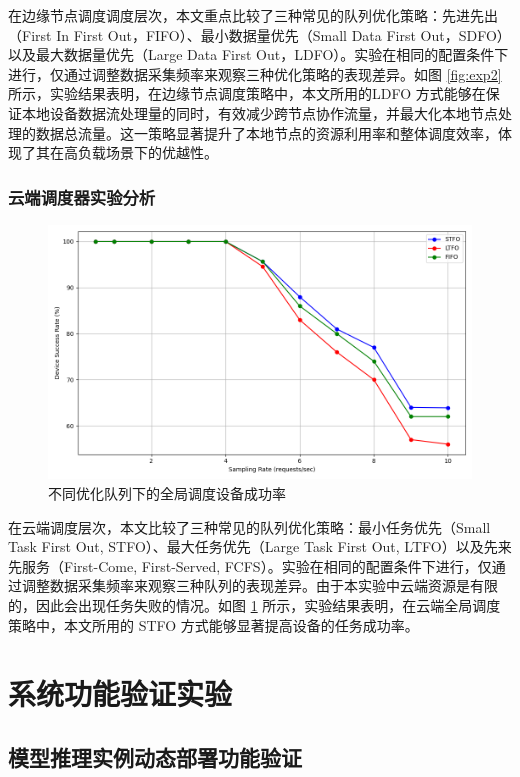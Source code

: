 在边缘节点调度调度层次，本文重点比较了三种常见的队列优化策略：先进先出（First In First Out，FIFO）、最小数据量优先（Small Data First Out，SDFO）以及最大数据量优先（Large Data First Out，LDFO）。实验在相同的配置条件下进行，仅通过调整数据采集频率来观察三种优化策略的表现差异。如图 \ref{fig:exp2} 所示，实验结果表明，在边缘节点调度策略中，本文所用的LDFO 方式能够在保证本地设备数据流处理量的同时，有效减少跨节点协作流量，并最大化本地节点处理的数据总流量。这一策略显著提升了本地节点的资源利用率和整体调度效率，体现了其在高负载场景下的优越性。

\subsubsection{云端调度器实验分析}

\begin{figure}[ht]
  \centering
  \includegraphics[width=0.8\linewidth]{pics/expr/exp5_frequency_device_success_rate.png}
  \caption{不同优化队列下的全局调度设备成功率}
  \label{fig:exp4}
\end{figure}

在云端调度层次，本文比较了三种常见的队列优化策略：最小任务优先（Small Task First Out, STFO）、最大任务优先（Large Task First Out, LTFO）以及先来先服务（First-Come, First-Served, FCFS）。实验在相同的配置条件下进行，仅通过调整数据采集频率来观察三种队列的表现差异。由于本实验中云端资源是有限的，因此会出现任务失败的情况。如图 \ref{fig:exp4} 所示，实验结果表明，在云端全局调度策略中，本文所用的 STFO 方式能够显著提高设备的任务成功率。

\section{系统功能验证实验}

\subsection{模型推理实例动态部署功能验证}

